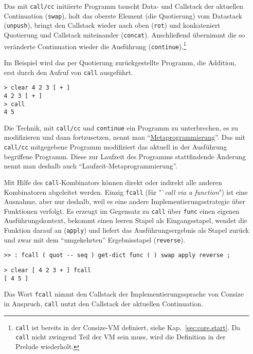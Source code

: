 Das mit \verb|call/cc| initiierte Programm tauscht Data- und Callstack der aktuellen Continuation (\verb|swap|), holt das oberste Element (die Quotierung) vom Datastack (\verb|unpush|), bringt den Callstack wieder nach oben (\verb|rot|) und konkateniert Quotierung und Callstack miteinander (\verb|concat|). Anschließend übernimmt die so veränderte Continuation wieder die Aus\-füh\-rung (\verb|continue|).\footnote{\texttt{call} ist bereits in der Consize-VM definiert, siehe Kap.~\ref{sec:core.start}. Da \texttt{call} nicht zwingend Teil der VM sein muss, wird die Definition in der Prelude wiederholt.} 

Im Beispiel wird das per Quotierung zurückgestellte Programm, die Addition, erst durch den Aufruf von \verb|call| ausgeführt.

\begin{verbatim}
> clear 4 2 3 [ + ]
4 2 3 [ + ]
> call
4 5
\end{verbatim}

Die Technik, mit \verb|call/cc| und \verb|continue| ein Programm zu unterbrechen, es zu modifizieren und dann fortzusetzen, nennt man "`\href{http://de.wikipedia.org/wiki/Metaprogrammierung}{Metaprogrammierung}"'. Das mit \verb|call/cc| mitgegebene Programm modifiziert das aktuell in der Ausführung begriffene Programm. Diese zur Laufzeit des Programms stattfindende Änderung nennt man  deshalb auch "`Laufzeit-Metaprogrammierung"'.

Mit Hilfe des \verb|call|-Kombinators können direkt oder indirekt alle anderen Kombinatoren abgeleitet werden. Einzig \verb|fcall| (für "`\emph{call via a function}") ist eine Ausnahme, aber nur deshalb, weil es eine andere Implementierungsstrategie über Funktionen verfolgt. Es erzeugt im Gegensatz zu \verb|call| über \verb|func| einen eigenen Ausführungs\-kon\-text, bekommt einen leeren Stapel als Eingangsstapel, wendet die Funktion darauf an (\verb|apply|) und liefert das Ausführungsergebnis als Stapel zurück und zwar mit dem "`umgekehrten"' Ergebnisstapel (\verb|reverse|).

\begin{verbatim}
>> : fcall ( quot -- seq ) get-dict func ( ) swap apply reverse ;  
\end{verbatim}

\begin{verbatim}
> clear [ 4 2 3 + ] fcall
[ 4 5 ]
\end{verbatim}

Das Wort \verb|fcall| nimmt den Callstack der Implementierungssprache von Consize in Anspruch, \verb|call| nutzt den Callstack der aktuellen Continuation.

